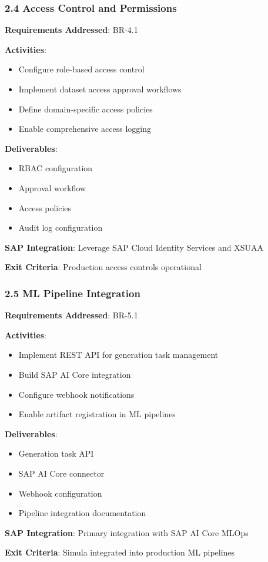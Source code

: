 \documentclass[12pt,a4paper,twoside]{report}
\begin{document}
\subsubsection{2.4 Access Control and Permissions}

\begin{tcolorbox}[colback=green!5,colframe=green!70,title=2.4 RBAC Implementation]
\textbf{Requirements Addressed}: BR-4.1

\textbf{Activities}:
\begin{itemize}
\item Configure role-based access control
\item Implement dataset access approval workflows
\item Define domain-specific access policies
\item Enable comprehensive access logging
\end{itemize}

\textbf{Deliverables}:
\begin{itemize}
\item RBAC configuration
\item Approval workflow
\item Access policies
\item Audit log configuration
\end{itemize}

\textbf{SAP Integration}: Leverage SAP Cloud Identity Services and XSUAA

\textbf{Exit Criteria}: Production access controls operational
\end{tcolorbox}

\subsubsection{2.5 ML Pipeline Integration}

\begin{tcolorbox}[colback=green!5,colframe=green!70,title=2.5 MLOps Integration]
\textbf{Requirements Addressed}: BR-5.1

\textbf{Activities}:
\begin{itemize}
\item Implement REST API for generation task management
\item Build SAP AI Core integration
\item Configure webhook notifications
\item Enable artifact registration in ML pipelines
\end{itemize}

\textbf{Deliverables}:
\begin{itemize}
\item Generation task API
\item SAP AI Core connector
\item Webhook configuration
\item Pipeline integration documentation
\end{itemize}

\textbf{SAP Integration}: Primary integration with SAP AI Core MLOps

\textbf{Exit Criteria}: Simula integrated into production ML pipelines
\end{tcolorbox}
\end{document}
